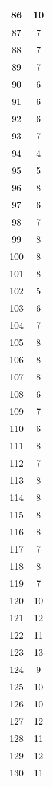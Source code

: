 \documentclass[letterpaper, 12pt]{article}
\begin{document}
\begin{longtable}{|c|c|}
\hline
86 & 10 \\
\hline
87 & 7 \\
\hline
88 & 7 \\
\hline
89 & 7 \\
\hline
90 & 6 \\
\hline
91 & 6 \\
\hline
92 & 6 \\
\hline
93 & 7 \\
\hline
94 & 4 \\
\hline
95 & 5 \\
\hline
96 & 8 \\
\hline
97 & 6 \\
\hline
98 & 7 \\
\hline
99 & 8 \\
\hline
100 & 8 \\
\hline
101 & 8 \\
\hline
102 & 5 \\
\hline
103 & 6 \\
\hline
104 & 7 \\
\hline
105 & 8 \\
\hline
106 & 8 \\
\hline
107 & 8 \\
\hline
108 & 6 \\
\hline
109 & 7 \\
\hline
110 & 6 \\
\hline
111 & 8 \\
\hline
112 & 7 \\
\hline
113 & 8 \\
\hline
114 & 8 \\
\hline
115 & 8 \\
\hline
116 & 8 \\
\hline
117 & 7 \\
\hline
118 & 8 \\
\hline
119 & 7 \\
\hline
120 & 10 \\
\hline
121 & 12 \\
\hline
122 & 11 \\
\hline
123 & 13 \\
\hline
124 & 9 \\
\hline
125 & 10 \\
\hline
126 & 10 \\
\hline
127 & 12 \\
\hline
128 & 11 \\
\hline
129 & 12 \\
\hline
130 & 11 \\

\end{longtable}
\end{document}
